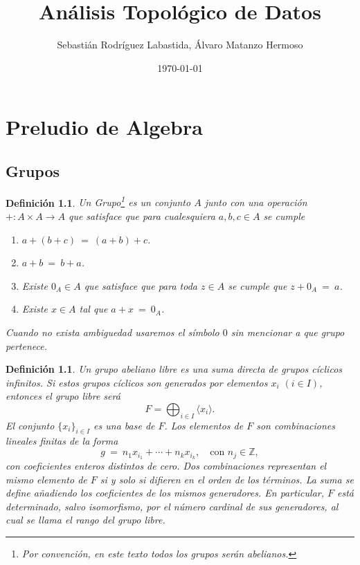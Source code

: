 \documentclass[12pt]{book}
\theoremstyle{plain}
\numberwithin{equation}{section} %
\newtheorem{definition}[thm]{Definición}
\begin{document}
\author{Sebastián Rodríguez Labastida, Álvaro Matanzo Hermoso}
\title{Análisis Topológico de Datos}
\date{\today}
\frontmatter
\maketitle

\chapter{Preludio de Algebra}
\section{Grupos}
\begin{definition}\label{def:grupo}
Un \textit{Grupo}\footnote{Por convención, en este texto todos los grupos serán abelianos.} es un conjunto $A$ junto con una operación $+\colon A\times A\rightarrow A$ que satisface que para cualesquiera $a,b,c \in A$ se cumple
\begin{enumerate}
	\item $a+(b+c) \ =\ (a+b)+c$.
	\item $a+b \ =\ b+a $.
	\item Existe $0_A \in A$ que satisface que para toda $z\in A$ se cumple que $z+0_A \ =\ a$.
	\item Existe $x\in A$ tal que $a+x \ =\ 0_A$.
\end{enumerate}
Cuando no exista ambiguedad usaremos el símbolo $0$ sin mencionar a que grupo pertenece.
\end{definition}


\begin{definition}\label{def:free-abelian-group}
Un \textit{grupo abeliano libre} es una suma directa de grupos cíclicos infinitos.
Si estos grupos cíclicos son generados por elementos $x_i$ $(i \in I)$, entonces
el grupo libre será
\[
F = \bigoplus_{i \in I} \langle x_i \rangle.
\]
El conjunto $\{x_i\}_{i \in I}$ es una base de $F$. Los elementos de $F$ son
combinaciones lineales finitas de la forma
\[
g \ =\ n_1x_{i_1} + \cdots + n_kx_{i_k}, \quad \text{con } n_j \in \mathbb{Z},
\]
con coeficientes enteros distintos de cero. Dos combinaciones representan el
mismo elemento de $F$ si y solo si difieren en el orden de los términos.
La suma se define añadiendo los coeficientes de los mismos generadores.
En particular, $F$ está determinado, salvo isomorfismo, por el número cardinal
de sus generadores, al cual se llama el \textit{rango} del grupo libre.
\end{definition}
\end{document}
